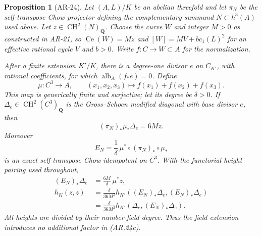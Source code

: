 \documentclass[11pt,a4paper]{article}
\newtheorem{proposition}[theorem]{Proposition}
\begin{document}
\begin{proposition}[AR-24]
Let $(A,L)/K$ be an abelian threefold and let $\pi_N$ be the
self-transpose Chow projector defining the complementary summand
$N\subset h^3(A)$ used above.  Let $z\in\operatorname{CH}^2(N)_\mathbf Q$.
Choose the curve $W$ and integer $M>0$ as constructed in AR-21,
so $\operatorname{Ce}(W)=Mz$ and
$[W]=MV+b c_1(L)^2$ for an effective rational cycle $V$ and $b>0$.
Write $f:C\to W\subset A$ for the normalization.

After a finite extension $K'/K$, there is a degree-one divisor $e$ on
$C_{K'}$, with rational coefficients, for which
$\operatorname{alb}_A(f_*e)=0$.  Define
\[
 \mu:C^3\longrightarrow A,\qquad
 (x_1,x_2,x_3)\longmapsto f(x_1)+f(x_2)+f(x_3).
\]
This map is generically finite and surjective; let its degree be
$\delta>0$.  If $\Delta_e\in\operatorname{CH}^2(C^3)_\mathbf Q$ is
the Gross--Schoen modified diagonal with base divisor $e$, then
\[
 (\pi_N)_*\mu_*\Delta_e=6Mz.                         \tag{AR.24a}
\]
Moreover
\[
 E_N=\frac1\delta\,\mu^*\circ(\pi_N)_*\circ\mu_*
                                                        \tag{AR.24b}
\]
is an exact self-transpose Chow idempotent on $C^3$.  With the
functorial height pairing used throughout,
\[
 \begin{split}
 (E_N)_*\Delta_e&=\frac{6M}{\delta}\,\mu^*z,\\
 h_K(z,z)
 &=\frac{\delta}{36M^2}
       h_{K'}((E_N)_*\Delta_e,(E_N)_*\Delta_e)\\
 &=\frac{\delta}{36M^2}
       h_{K'}(\Delta_e,(E_N)_*\Delta_e).
 \end{split}                                             \tag{AR.24c}
\]
All heights are divided by their number-field degree.  Thus the field
extension introduces no additional factor in (AR.24c).
\end{proposition}
\end{document}
